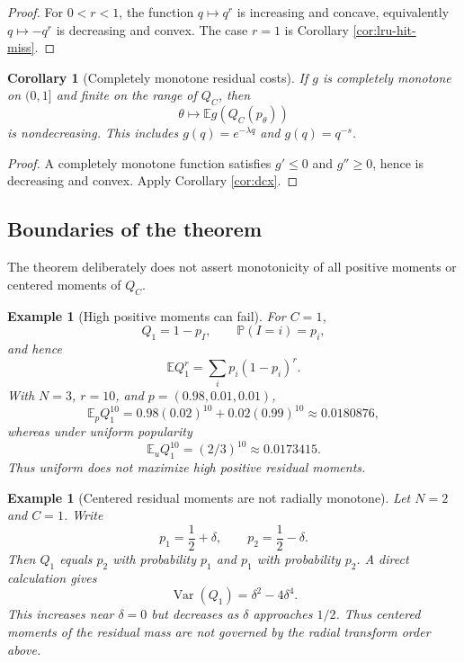 \documentclass[11pt]{article}
\newtheorem{corollary}[theorem]{Corollary}
\newtheorem{example}[theorem]{Example}
\newcommand{\E}{\mathbb E}
\newcommand{\Pbb}{\mathbb P}
\newcommand{\1}{\mathbf 1}
\newcommand{\Var}{\operatorname{Var}}
\begin{document}
\begin{proof}
For $0<r<1$, the function $q\mapsto q^r$ is increasing and concave, equivalently
$q\mapsto -q^r$ is decreasing and convex.  The case $r=1$ is Corollary
\ref{cor:lru-hit-miss}.
\end{proof}

\begin{corollary}[Completely monotone residual costs]\label{cor:cm}
If $g$ is completely monotone on $(0,1]$ and finite on the range of $Q_C$, then
\[
        \theta\mapsto \E g(Q_C(p_\theta))
\]
is nondecreasing.  This includes $g(q)=e^{-\lambda q}$ and $g(q)=q^{-s}$.
\end{corollary}

\begin{proof}
A completely monotone function satisfies $g'\le0$ and $g''\ge0$, hence is decreasing and
convex.  Apply Corollary \ref{cor:dcx}.
\end{proof}

\subsection{Boundaries of the theorem}

The theorem deliberately does not assert monotonicity of all positive moments or centered
moments of $Q_C$.

\begin{example}[High positive moments can fail]\label{ex:high-positive}
For $C=1$,
\[
        Q_1=1-p_I,
        \qquad \Pbb(I=i)=p_i,
\]
and hence
\[
        \E Q_1^r=\sum_i p_i(1-p_i)^r.
\]
With $N=3$, $r=10$, and $p=(0.98,0.01,0.01)$,
\[
        \E_p Q_1^{10}
        =0.98(0.02)^{10}+0.02(0.99)^{10}
        \approx 0.0180876,
\]
whereas under uniform popularity
\[
        \E_u Q_1^{10}=(2/3)^{10}\approx0.0173415.
\]
Thus uniform does not maximize high positive residual moments.
\end{example}

\begin{example}[Centered residual moments are not radially monotone]\label{ex:centered}
Let $N=2$ and $C=1$.  Write
\[
        p_1=\frac12+\delta,
        \qquad
        p_2=\frac12-\delta.
\]
Then $Q_1$ equals $p_2$ with probability $p_1$ and $p_1$ with probability $p_2$.  A direct
calculation gives
\[
        \Var(Q_1)=\delta^2-4\delta^4.
\]
This increases near $\delta=0$ but decreases as $\delta$ approaches $1/2$.  Thus centered
moments of the residual mass are not governed by the radial transform order above.
\end{example}
\end{document}
